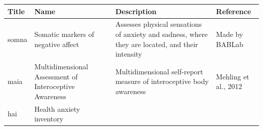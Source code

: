 \documentclass[]{book}
\begin{document}
\begin{longtable}[]{@{}llll@{}}
\toprule
\begin{minipage}[b]{0.22\columnwidth}\raggedright
Title\strut
\end{minipage} & \begin{minipage}[b]{0.27\columnwidth}\raggedright
Name\strut
\end{minipage} & \begin{minipage}[b]{0.22\columnwidth}\raggedright
Description\strut
\end{minipage} & \begin{minipage}[b]{0.18\columnwidth}\raggedright
Reference\strut
\end{minipage}\tabularnewline
\midrule
\endhead
\begin{minipage}[t]{0.22\columnwidth}\raggedright
somna\strut
\end{minipage} & \begin{minipage}[t]{0.27\columnwidth}\raggedright
Somatic markers of negative affect\strut
\end{minipage} & \begin{minipage}[t]{0.22\columnwidth}\raggedright
Assesses physical sensations of anxiety and sadness, where they are located, and their intensity\strut
\end{minipage} & \begin{minipage}[t]{0.18\columnwidth}\raggedright
Made by BABLab\strut
\end{minipage}\tabularnewline
\begin{minipage}[t]{0.22\columnwidth}\raggedright
maia\strut
\end{minipage} & \begin{minipage}[t]{0.27\columnwidth}\raggedright
Multidimensional Assessment of Interoceptive Awareness\strut
\end{minipage} & \begin{minipage}[t]{0.22\columnwidth}\raggedright
Multidimensional self-report measure of interoceptive body awareness\strut
\end{minipage} & \begin{minipage}[t]{0.18\columnwidth}\raggedright
Mehling et al., 2012\strut
\end{minipage}\tabularnewline
\begin{minipage}[t]{0.22\columnwidth}\raggedright
hai\strut
\end{minipage} & \begin{minipage}[t]{0.27\columnwidth}\raggedright
Health anxiety inventory\strut
\end{minipage} & \begin{minipage}[t]{0.22\columnwidth}\raggedright

\end{minipage}
\end{longtable}
\end{document}
